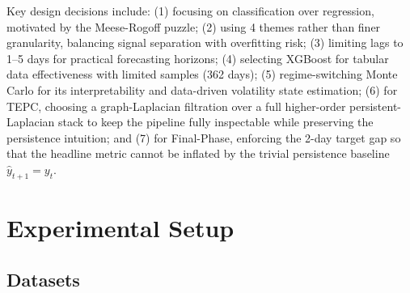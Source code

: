 \documentclass[11pt]{article}
\begin{document}
Key design decisions include: (1) focusing on classification over regression, motivated by the Meese-Rogoff puzzle; (2) using 4 themes rather than finer granularity, balancing signal separation with overfitting risk; (3) limiting lags to 1--5 days for practical forecasting horizons; (4) selecting XGBoost for tabular data effectiveness with limited samples (362 days); (5) regime-switching Monte Carlo for its interpretability and data-driven volatility state estimation; (6) for TEPC, choosing a graph-Laplacian filtration over a full higher-order persistent-Laplacian stack to keep the pipeline fully inspectable while preserving the persistence intuition; and (7) for Final-Phase, enforcing the 2-day target gap so that the headline metric cannot be inflated by the trivial persistence baseline $\hat{y}_{t+1}=y_t$.

\section{Experimental Setup}
\label{sec:setup}

\subsection{Datasets}

\begin{table}[t]
\centering
\small
\caption{Dataset Summary}
\label{tab:datasets}
\end{table}
\end{document}
